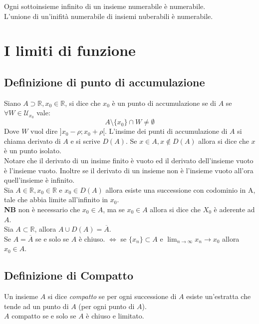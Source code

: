 \documentclass{article}
\begin{document}
Ogni sottoinsieme infinito di un insieme numerabile è numerabile.\\

L'unione di un'inifità numerabile di insiemi nuberabili è numerabile.

\section{I limiti di funzione}
\subsection{Definizione di punto di accumulazione}
Siano $A \supset \mathbb{R}, x_0 \in \mathbb{R}$, si dice che $x_0$ è un punto di accumulazione se di $A$ se $\forall W \in \mathcal{U}_{x_0}$ vale:
\begin{equation*}
	A \setminus \{x_0\} \cap W \neq \emptyset
\end{equation*}
Dove $W$ vuol dire $]x_0- \rho;x_0+ \rho[$. L'insime dei punti di accumulazione di $A$ si chiama derivato di $A$ e si scrive $D(A)$. Se $x \in A, x \notin D(A)$ allora si dice che $x$ è un punto isolato.\\
Notare che il derivato di un insime finito è vuoto ed il derivato dell'insieme vuoto è l'insieme vuoto. Inoltre se il derivato di un insieme non è l'insieme vuoto all'ora quell'insieme è infinito.\\
Sia $A \in \mathbb{R}, x_0 \in \mathbb{R}$ e $x_0 \in D(A)$ allora esiste una successione con codominio in A, tale che abbia limite all'infinito in $x_0$.\\
\textbf{NB} non è necessario che $x_0 \in A$, ma se $x_0 \in A$ allora si dice che $X_0$ è aderente ad $A$.\\
Sia $A \subset \mathbb{R}$, allora $A \cup D(A) = \overline A$.\\
Se $A= \overline A$ se e solo se $A$ è chiuso. $\iff$ se $\{x_n\} \subset A$ e $\lim_{n \to \infty}x_n \rightarrow x_0$ allora $x_0 \in A$.
\subsection{Definizione di Compatto}
Un insieme $A$ si dice \textit{compatto} se per ogni successione di $A$ esiste un'estratta che tende ad un punto di $A$ (per ogni punto di $A$).\\
$A$ compatto se e solo se $A$ è chiuso e limitato.
\end{document}
